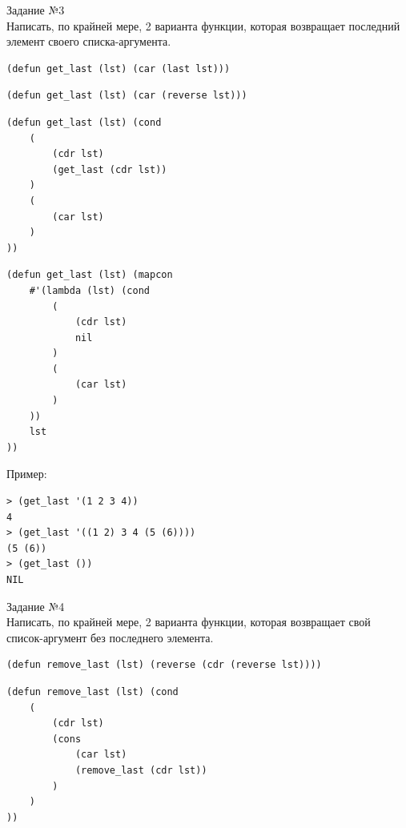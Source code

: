 {\LARGE Задание №3}\\

Написать, по крайней мере, 2 варианта функции, которая возвращает последний элемент своего списка-аргумента.

\begin{lstlisting}[caption=1-й вариант функции получения последнего элемента списка]
(defun get_last (lst) (car (last lst)))
\end{lstlisting}

\begin{lstlisting}[caption=2-й вариант функции получения последнего элемента списка]
(defun get_last (lst) (car (reverse lst)))
\end{lstlisting}

\begin{lstlisting}[caption=3-й вариант функции получения последнего элемента списка]
(defun get_last (lst) (cond 
	(
		(cdr lst)
		(get_last (cdr lst))
	)
	(
		(car lst)
	)
))
\end{lstlisting}

\vspace*{10mm}

\begin{lstlisting}[caption=4-й вариант функции получения последнего элемента списка]
(defun get_last (lst) (mapcon 
	#'(lambda (lst) (cond 
		(
			(cdr lst) 
			nil
		) 
		(
			(car lst)
		)
	)) 
	lst
))
\end{lstlisting}

Пример:
\begin{lstlisting}
> (get_last '(1 2 3 4))
4
> (get_last '((1 2) 3 4 (5 (6))))
(5 (6))
> (get_last ())
NIL
\end{lstlisting}

\vspace*{10mm}

{\LARGE Задание №4}\\

Написать, по крайней мере, 2 варианта функции, которая возвращает свой список-аргумент без последнего элемента.

\begin{lstlisting}[caption=1-й вариант функции получения спиcка без последнего элемента]
(defun remove_last (lst) (reverse (cdr (reverse lst))))
\end{lstlisting}

\begin{lstlisting}[caption=2-й вариант функции получения спиcка без последнего элемента]
(defun remove_last (lst) (cond 
	(
		(cdr lst) 
		(cons 
			(car lst) 
			(remove_last (cdr lst))
		)
	)
))
\end{lstlisting}

